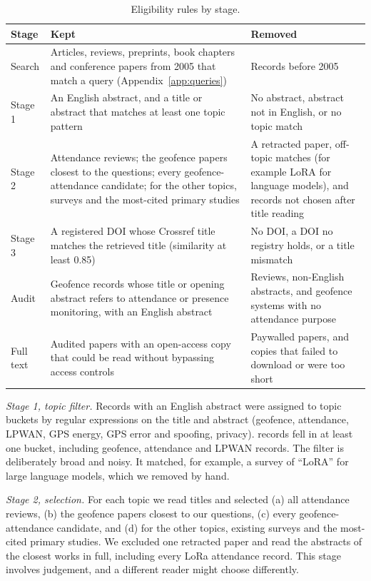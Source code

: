 \documentclass[preprint,12pt]{elsarticle}
\begin{document}
\begin{table}[tbp]\centering\footnotesize
\caption{Eligibility rules by stage.}\label{tab:elig}
\begin{tabular}{@{}L{1.7cm}L{5.8cm}L{5.1cm}@{}}\toprule
Stage & Kept & Removed \\ \midrule
Search & Articles, reviews, preprints, book chapters and conference papers from 2005 that match a query (Appendix~\ref{app:queries}) & Records before 2005 \\
Stage 1 & An English abstract, and a title or abstract that matches at least one topic pattern & No abstract, abstract not in English, or no topic match \\
Stage 2 & Attendance reviews; the geofence papers closest to the questions; every geofence-attendance candidate; for the other topics, surveys and the most-cited primary studies & A retracted paper, off-topic matches (for example LoRA for language models), and records not chosen after title reading \\
Stage 3 & A registered DOI whose Crossref title matches the retrieved title (similarity at least 0.85) & No DOI, a DOI no registry holds, or a title mismatch \\
Audit & Geofence records whose title or opening abstract refers to attendance or presence monitoring, with an English abstract & Reviews, non-English abstracts, and geofence systems with no attendance purpose \\
Full text & Audited papers with an open-access copy that could be read without bypassing access controls & Paywalled papers, and copies that failed to download or were too short \\
\bottomrule\end{tabular}
\end{table}

\emph{Stage 1, topic filter.} Records with an English abstract were assigned to topic buckets by regular expressions on the title and abstract (geofence, attendance, LPWAN, GPS energy, GPS error and spoofing, privacy). \nStageOne{} records fell in at least one bucket, including \nGeofenceBucket{} geofence, \nAttBucket{} attendance and \nLpwanBucket{} LPWAN records. The filter is deliberately broad and noisy. It matched, for example, a survey of ``LoRA'' for large language models, which we removed by hand.

\emph{Stage 2, selection.} For each topic we read titles and selected (a) all attendance reviews, (b) the geofence papers closest to our questions, (c) every geofence-attendance candidate, and (d) for the other topics, existing surveys and the most-cited primary studies. We excluded one retracted paper and read the abstracts of the closest works in full, including every LoRa attendance record. This stage involves judgement, and a different reader might choose differently.
\end{document}
